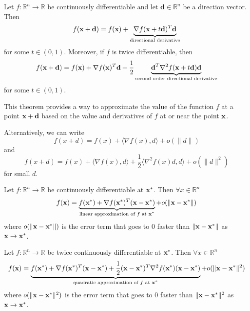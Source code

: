 \begin{theorem}
  Let $f: \mathbb R^n \to \mathbb R$ be continuously differentiable and let $\textbf{d} \in \mathbb R^n$ be a direction vector. Then
  $$f(\textbf{x} + \textbf{d}) = f(\textbf{x}) + \underbrace{\nabla f(\textbf{x} + t\textbf{d})^T \textbf{d}}_{\text{directional derivative}}$$ for some $t \in (0,1)$. Moreover, if $f$ is twice differentiable, then
  $$f(\textbf{x} + \textbf{d}) = f(\textbf{x}) + \nabla f(\textbf{x})^T\textbf{d} + \frac{1}{2} \underbrace{\textbf{d}^T \nabla^2 f(\textbf{x} + t\textbf{d}) \textbf{d}}_{\text{second order directional derivative}}$$ for some $t \in (0,1)$.

  \bigskip
  This theorem provides a way to approximate the value of the function $f$ at a point $\textbf{x} + \textbf{d}$ based on the value and derivatives of $f$ at or near the point $\textbf{x}$.

  \bigskip
  Alternatively, we can write
  $$f(x + d) = f(x) + \langle \nabla f(x), d \rangle + o(\|d\|)$$
  and
  $$f(x + d) = f(x) + \langle \nabla f(x), d \rangle + \frac{1}{2} \langle \nabla^2 f(x) d, d \rangle + o(\|d\|^2)$$ for small $d$. 
\end{theorem}
\begin{theorem}
  Let $f: \mathbb R^n \to \mathbb R$ be continuously differentiable at $\textbf{x}^*$. Then $\forall x \in \mathbb R^n$
  $$f(\textbf{x}) = \underbrace{f(\textbf{x}^*) + \nabla f(\textbf{x}^*)^T (\textbf{x} - \textbf{x}^*)}_{\text{linear approximation of $f$ at $\textbf{x}^*$}} + o(\| \textbf{x} - \textbf{x}^* \|)$$
  where $o(\| \textbf{x} - \textbf{x}^* \|)$ is the error term that goes to 0 faster than $\| \textbf{x} - \textbf{x}^* \|$ as $\textbf{x} \to \textbf{x}^*$.

  Let $f: \mathbb R^n \to \mathbb R$ be twice continuously differentiable at $\textbf{x}^*$. Then $\forall x \in \mathbb R^n$
  $$f(\textbf{x}) = \underbrace{f(\textbf{x}^*) + \nabla f(\textbf{x}^*)^T (\textbf{x} - \textbf{x}^*) + \frac{1}{2} (\textbf{x} - \textbf{x}^*)^T \nabla^2 f(\textbf{x}^*) (\textbf{x} - \textbf{x}^*)}_{\text{quadratic approximation of $f$ at $\textbf{x}^*$}} + o(\| \textbf{x} - \textbf{x}^* \|^2)$$
  where $o(\| \textbf{x} - \textbf{x}^* \|^2)$ is the error term that goes to 0 faster than $\| \textbf{x} - \textbf{x}^* \|^2$ as $\textbf{x} \to \textbf{x}^*$.
\end{theorem}
